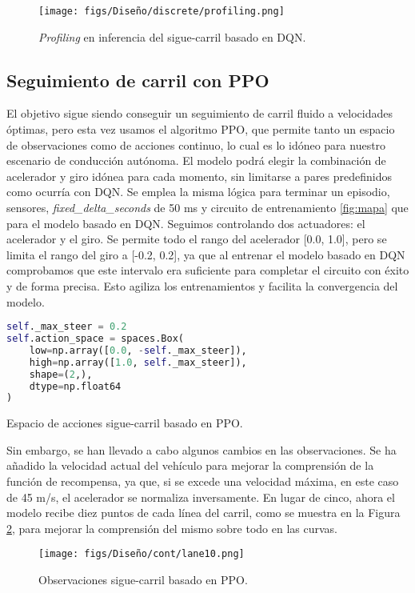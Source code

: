 \begin{figure}[ht]
\centering
\texttt{[image: figs/Diseño/discrete/profiling.png]}
\caption{\textit{Profiling} en inferencia del sigue-carril basado en \ac{DQN}.}
\label{fig:profiling_dqn}
\end{figure}

\subsection{Seguimiento de carril con \ac{PPO}}

El objetivo sigue siendo conseguir un seguimiento de carril fluido a velocidades óptimas, pero esta vez usamos el algoritmo \ac{PPO}, que permite tanto un espacio de observaciones como de acciones continuo, lo cual es lo idóneo para nuestro escenario de conducción autónoma. El modelo podrá elegir la combinación de acelerador y giro idónea para cada momento, sin limitarse a pares predefinidos como ocurría con \ac{DQN}. Se emplea la misma lógica para terminar un episodio, sensores, \textit{fixed\_delta\_seconds} de 50 ms y circuito de entrenamiento \ref{fig:mapa} que para el modelo basado en \ac{DQN}. Seguimos controlando dos actuadores: el acelerador y el giro. Se permite todo el rango del acelerador [0.0, 1.0], pero se limita el rango del giro a [-0.2, 0.2], ya que al entrenar el modelo basado en \ac{DQN} comprobamos que este intervalo era suficiente para completar el circuito con éxito y de forma precisa. Esto agiliza los entrenamientos y facilita la convergencia del modelo.

\begin{code}[h]
\begin{lstlisting}[language=Python]
self._max_steer = 0.2
self.action_space = spaces.Box(
    low=np.array([0.0, -self._max_steer]),
    high=np.array([1.0, self._max_steer]),
    shape=(2,),
    dtype=np.float64
)
\end{lstlisting}
\caption[Espacio de acciones sigue-carril basado en \ac{PPO}]{Espacio de acciones sigue-carril basado en \ac{PPO}.}
\label{cod:acc_ppo}
\end{code}

Sin embargo, se han llevado a cabo algunos cambios en las observaciones. Se ha añadido la velocidad actual del vehículo para mejorar la comprensión de la función de recompensa, ya que, si se excede una velocidad máxima, en este caso de 45 m/s, el acelerador se normaliza inversamente. En lugar de cinco, ahora el modelo recibe diez puntos de cada línea del carril, como se muestra en la Figura \ref{fig:puntos_carril_ppo}, para mejorar la comprensión del mismo sobre todo en las curvas.
\begin{figure}[ht]
\centering
\texttt{[image: figs/Diseño/cont/lane10.png]}
\caption{Observaciones sigue-carril basado en \ac{PPO}.}
\label{fig:puntos_carril_ppo}
\end{figure}

